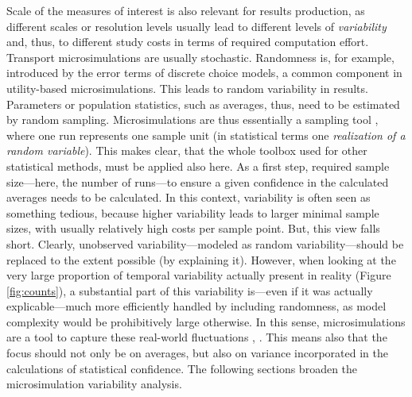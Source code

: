 Scale of the measures of interest is also relevant for results production, as different scales or resolution levels usually lead to different levels of \emph{variability} and, thus, to different study costs in terms of required computation effort. Transport microsimulations are usually stochastic. Randomness is, for example, introduced by the error terms of discrete choice models, a common component in utility-based microsimulations. This leads to random variability in results. Parameters or population statistics, such as averages, thus, need to be estimated by random sampling. Microsimulations are thus essentially a sampling tool \citep[][]{WolfDA_CSP_2001}, where one run represents one sample unit (in statistical terms one \emph{realization of a random variable}). This makes clear, that the whole toolbox used for other statistical methods, must be applied also here. As a first step, required sample size---here, the number of runs---to ensure a given confidence in the calculated averages needs to be calculated. In this context, variability is often seen as something tedious, because higher variability leads to larger minimal sample sizes, with usually relatively high costs per sample point. But, this view falls short. Clearly, unobserved variability---modeled as random variability---should be replaced to the extent possible (by explaining it). However, when looking at the very large proportion of temporal variability actually present in reality (Figure \ref{fig:counts}), a substantial part of this variability is---even if it was actually explicable---much more efficiently handled by including randomness, as model complexity would be prohibitively large otherwise. In this sense, microsimulations are a tool to capture these real-world fluctuations \citep[][p.11]{NewmanMEJBarkema_1999}, \citep[][p.704]{EsserNagel_Hensher_2001}. This means also that the focus should not only be on averages, but also on variance incorporated in the calculations of statistical confidence. The following sections broaden the microsimulation variability analysis.

